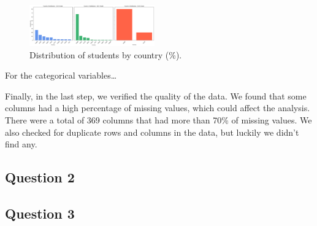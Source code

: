 \begin{figure}
    \centering
    \includegraphics[width=0.48\textwidth]{figures/Q1_CountryDistri.png}
    \caption{Distribution of students by country (\%).}
    \label{fig:country_distribution}
\end{figure}

For the categorical variables\dots

Finally, in the last step, we verified the quality of the data. We found that some columns had a high percentage of missing values, which could affect the analysis. There were a total of 369 columns that had more than 70\% of missing values.
We also checked for duplicate rows and columns in the data, but luckily we didn't find any.

\subsection{Question 2}

\subsection{Question 3}